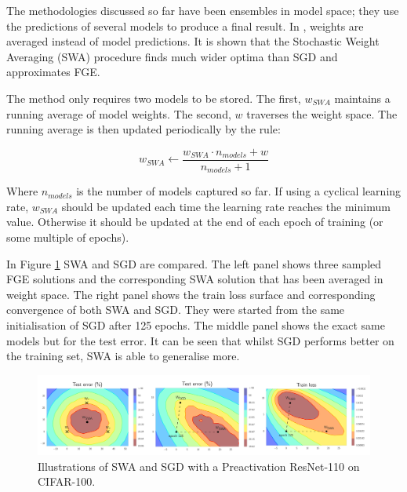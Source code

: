The methodologies discussed so far have been ensembles in model space; they use the predictions of several models to produce a final result.
In \cite{Izmailov_Podoprikhin_Garipov_Vetrov_Wilson_2018}, weights are averaged instead of model predictions.
It is shown that the Stochastic Weight Averaging (SWA) procedure finds much wider optima than SGD and approximates FGE.

The method only requires two models to be stored.
The first, $w_{SWA}$ maintains a running average of model weights.
The second, $w$ traverses the weight space.
The running average is then updated periodically by the rule:

\begin{equation}
    w_{SWA} \leftarrow \frac{w_{SWA} \cdot n_{models} + w}{n_{models} + 1}
    \label{eq:swa}
\end{equation}

Where $n_{models}$ is the number of models captured so far.
If using a cyclical learning rate, $w_{SWA}$ should be updated each time the learning rate reaches the minimum value.
Otherwise it should be updated at the end of each epoch of training (or some multiple of epochs).

In Figure \ref{fig:SWA} SWA and SGD are compared.
The left panel shows three sampled FGE solutions and the corresponding SWA solution that has been averaged in weight space.
The right panel shows the train loss surface and corresponding convergence of both SWA and SGD.
They were started from the same initialisation of SGD after 125 epochs.
The middle panel shows the exact same models but for the test error.
It can be seen that whilst SGD performs better on the training set, SWA is able to generalise more.

\begin{figure}[hbtp!]
    \centering
    \includegraphics[width=\textwidth]{./img/SWA.png}
    \caption{Illustrations of SWA and SGD with a Preactivation ResNet-110 on CIFAR-100. \cite{Izmailov_Podoprikhin_Garipov_Vetrov_Wilson_2018}}
    \label{fig:SWA}
\end{figure}







